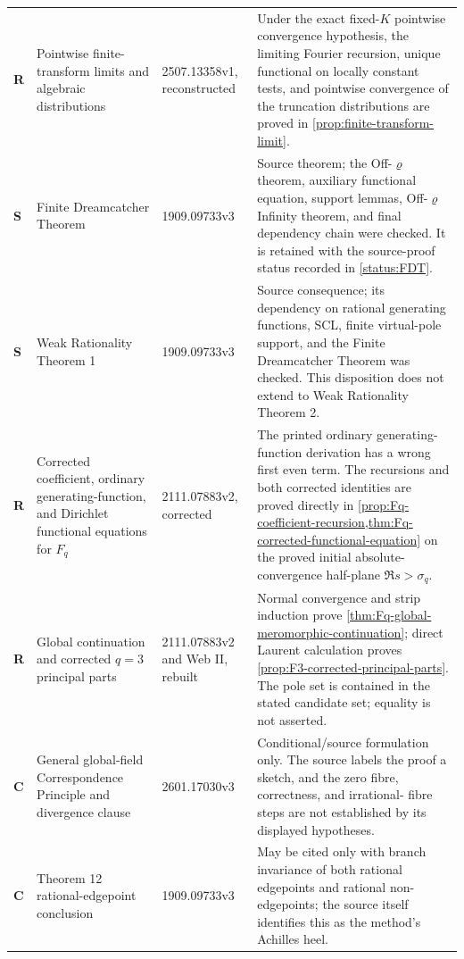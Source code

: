 \begin{longtable}{@{}p{}p{}p{}p{}@{}}
\textbf{R} & Pointwise finite-transform limits and algebraic distributions &
2507.13358v1, reconstructed & Under the exact fixed-$K$ pointwise convergence
hypothesis, the limiting Fourier recursion, unique functional on locally
constant tests, and pointwise convergence of the truncation distributions are
proved in \cref{prop:finite-transform-limit}.\\

\textbf{S} & Finite Dreamcatcher Theorem & 1909.09733v3 & Source theorem;
the Off-$\varrho$ theorem, auxiliary functional equation, support lemmas,
Off-$\varrho$ Infinity theorem, and final dependency chain were checked.  It
is retained with the source-proof status recorded in \cref{status:FDT}.\\

\textbf{S} & Weak Rationality Theorem 1 & 1909.09733v3 & Source consequence;
its dependency on rational generating functions, SCL, finite virtual-pole
support, and the Finite Dreamcatcher Theorem was checked.  This disposition
does not extend to Weak Rationality Theorem 2.\\

\textbf{R} & Corrected coefficient, ordinary generating-function, and
Dirichlet functional equations for $F_q$ & 2111.07883v2, corrected & The
printed ordinary generating-function derivation has a wrong first even
term.  The recursions and both corrected identities are proved directly in
\cref{prop:Fq-coefficient-recursion,thm:Fq-corrected-functional-equation}
on the proved initial absolute-convergence half-plane
$\Re s>\sigma_q$.\\

\textbf{R} & Global continuation and corrected $q=3$ principal parts &
2111.07883v2 and Web II, rebuilt & Normal convergence and strip induction
prove \cref{thm:Fq-global-meromorphic-continuation}; direct Laurent
calculation proves \cref{prop:F3-corrected-principal-parts}.  The pole set
is contained in the stated candidate set; equality is not asserted.\\

\textbf{C} & General global-field Correspondence Principle and divergence
clause & 2601.17030v3 & Conditional/source formulation only.  The source
labels the proof a sketch, and the zero fibre, correctness, and irrational-
fibre steps are not established by its displayed hypotheses.\\

\textbf{C} & Theorem 12 rational-edgepoint conclusion & 1909.09733v3 & May
be cited only with branch invariance of both rational edgepoints and rational
non-edgepoints; the source itself identifies this as the method's Achilles
heel.\\


\end{longtable}
